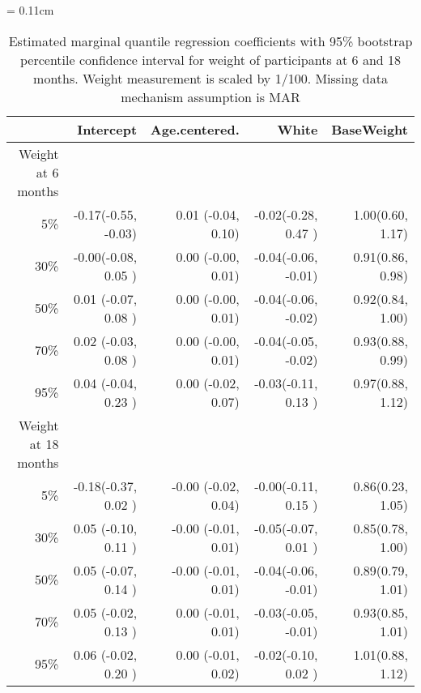 \documentclass[12pt]{article}
\begin{document}
\begin{table}[ht]
  \renewcommand{\arraystretch}{1.3}
  \begin{center}
    \caption{Estimated marginal quantile regression coefficients with
      95\% bootstrap percentile confidence interval for weight of
      participants at 6 and 18 months. Weight measurement is scaled by
      1/100. Missing data mechanism assumption is MAR}\label{tab:w2}
    \vspace{10pt} \tabcolsep = 0.11cm
    \begin{tabular}{rrrrr}
      \toprule
      & Intercept            & Age.centered.         & White               & BaseWeight       \\
      \hline
      Weight at 6 months                                                                           \\
      5\%  & -0.17(-0.55, -0.03)  & 0.01  (-0.04, 0.10)   & -0.02(-0.28, 0.47 ) & 1.00(0.60, 1.17) \\
      30\% & -0.00(-0.08, 0.05 )  & 0.00  (-0.00, 0.01)   & -0.04(-0.06, -0.01) & 0.91(0.86, 0.98) \\
      50\% & 0.01 (-0.07, 0.08 )  & 0.00  (-0.00, 0.01)   & -0.04(-0.06, -0.02) & 0.92(0.84, 1.00) \\
      70\% & 0.02 (-0.03, 0.08 )  & 0.00  (-0.00, 0.01)   & -0.04(-0.05, -0.02) & 0.93(0.88, 0.99) \\
      95\% & 0.04 (-0.04, 0.23 )  & 0.00  (-0.02, 0.07)   & -0.03(-0.11, 0.13 ) & 0.97(0.88, 1.12) \\
      Weight at 18 months                                                                          \\
      5\%  & -0.18(-0.37, 0.02 )  & -0.00 (-0.02, 0.04)   & -0.00(-0.11, 0.15 ) & 0.86(0.23, 1.05) \\
      30\% & 0.05 (-0.10, 0.11 )  & -0.00 (-0.01, 0.01)   & -0.05(-0.07, 0.01 ) & 0.85(0.78, 1.00) \\
      50\% & 0.05 (-0.07, 0.14 )  & -0.00 (-0.01, 0.01)   & -0.04(-0.06, -0.01) & 0.89(0.79, 1.01) \\
      70\% & 0.05 (-0.02, 0.13 )  & 0.00  (-0.01, 0.01)   & -0.03(-0.05, -0.01) & 0.93(0.85, 1.01) \\
      95\% & 0.06 (-0.02, 0.20 )  & 0.00  (-0.01, 0.02)   & -0.02(-0.10, 0.02 ) & 1.01(0.88, 1.12) \\
      \bottomrule
    \end{tabular}
  \end{center}
\end{table}
\end{document}
